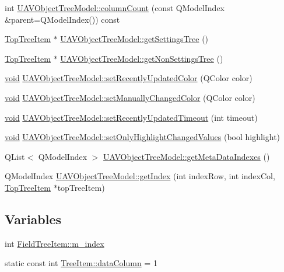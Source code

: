 \begin{DoxyCompactItemize}
int \hyperlink{group___u_a_v_object_browser_plugin_gafe7737e489b53e92c325a27785e690cd}{\-U\-A\-V\-Object\-Tree\-Model\-::column\-Count} (const \-Q\-Model\-Index \&parent=\-Q\-Model\-Index()) const 
\item 
\hyperlink{class_top_tree_item}{\-Top\-Tree\-Item} $\ast$ \hyperlink{group___u_a_v_object_browser_plugin_ga65564af37704d64b262417b4e5795b76}{\-U\-A\-V\-Object\-Tree\-Model\-::get\-Settings\-Tree} ()
\item 
\hyperlink{class_top_tree_item}{\-Top\-Tree\-Item} $\ast$ \hyperlink{group___u_a_v_object_browser_plugin_gaba7711ed458572937f031011b8ad9842}{\-U\-A\-V\-Object\-Tree\-Model\-::get\-Non\-Settings\-Tree} ()
\item 
\hyperlink{group___u_a_v_objects_plugin_ga444cf2ff3f0ecbe028adce838d373f5c}{void} \hyperlink{group___u_a_v_object_browser_plugin_gac3ae57e6538de964006edcdb0affb776}{\-U\-A\-V\-Object\-Tree\-Model\-::set\-Recently\-Updated\-Color} (\-Q\-Color color)
\item 
\hyperlink{group___u_a_v_objects_plugin_ga444cf2ff3f0ecbe028adce838d373f5c}{void} \hyperlink{group___u_a_v_object_browser_plugin_ga9bc5e49ee3b742c3f1b9ff05b71f7d7e}{\-U\-A\-V\-Object\-Tree\-Model\-::set\-Manually\-Changed\-Color} (\-Q\-Color color)
\item 
\hyperlink{group___u_a_v_objects_plugin_ga444cf2ff3f0ecbe028adce838d373f5c}{void} \hyperlink{group___u_a_v_object_browser_plugin_ga2b730043ef2a9acc337b2a6864894456}{\-U\-A\-V\-Object\-Tree\-Model\-::set\-Recently\-Updated\-Timeout} (int timeout)
\item 
\hyperlink{group___u_a_v_objects_plugin_ga444cf2ff3f0ecbe028adce838d373f5c}{void} \hyperlink{group___u_a_v_object_browser_plugin_gaef0cd94aa30b16dabefb791a32542b10}{\-U\-A\-V\-Object\-Tree\-Model\-::set\-Only\-Highlight\-Changed\-Values} (bool highlight)
\item 
\-Q\-List$<$ \-Q\-Model\-Index $>$ \hyperlink{group___u_a_v_object_browser_plugin_ga96556d7a4724a18462706ac54d6cc761}{\-U\-A\-V\-Object\-Tree\-Model\-::get\-Meta\-Data\-Indexes} ()
\item 
\-Q\-Model\-Index \hyperlink{group___u_a_v_object_browser_plugin_gaadbcc539338a28f21acc570915b786df}{\-U\-A\-V\-Object\-Tree\-Model\-::get\-Index} (int index\-Row, int index\-Col, \hyperlink{class_top_tree_item}{\-Top\-Tree\-Item} $\ast$top\-Tree\-Item)
\end{DoxyCompactItemize}
\subsection*{\-Variables}
\begin{DoxyCompactItemize}
\item 
int \hyperlink{group___u_a_v_object_browser_plugin_gab2e489418a60e96de39035e776c4e1e6}{\-Field\-Tree\-Item\-::m\-\_\-index}
\item 
static const int \hyperlink{group___u_a_v_object_browser_plugin_gad4ee9a1203f812d975a410765ddb8710}{\-Tree\-Item\-::data\-Column} = 1
\end{DoxyCompactItemize}
